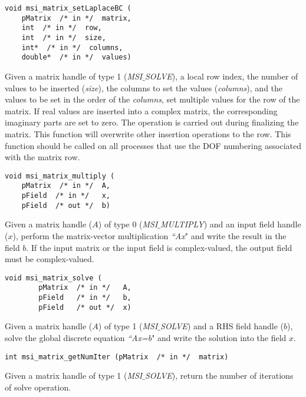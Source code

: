 \begin{verbatim}
void msi_matrix_setLaplaceBC (
    pMatrix  /* in */  matrix, 
    int  /* in */  row, 
    int  /* in */  size, 
    int*  /* in */  columns, 
    double*  /* in */  values)
\end{verbatim}\vspace{-.5cm}\hspace{1cm}
Given a matrix handle of type 1 (\textit{MSI$\_$SOLVE}), a local row index, the  number of values to be inserted (\textit{size}), the columns to set the values (\textit{columns}), and the values to be set in the order of the \textit{columns}, set multiple values for the row of the matrix. If real values are inserted into a complex matrix, the corresponding imaginary parts are set to zero. The operation is carried out during finalizing the matrix. 
This function will overwrite other insertion operations to the row. This function should be called on all processes that use the DOF numbering associated with the matrix row.

\begin{verbatim}
void msi_matrix_multiply (
    pMatrix  /* in */  A, 
    pField  /* in */   x, 
    pField  /* out */  b)
\end{verbatim}\vspace{-.5cm}\hspace{1cm}
Given a matrix handle ($A$) of type 0 (\textit{MSI$\_$MULTIPLY}) and an input field handle ($x$), perform the matrix-vector multiplication \textit{``Ax}" and write the result in the field $b$. If the input matrix or the input field is complex-valued, the output field must be complex-valued.

\begin{verbatim}
void msi_matrix_solve (
        pMatrix  /* in */   A, 
        pField   /* in */   b, 
        pField   /* out */  x)
\end{verbatim}\vspace{-.5cm}\hspace{1cm}
Given a matrix handle ($A$) of type 1 (\textit{MSI$\_$SOLVE}) and a RHS field handle ($b$), solve the global discrete equation \textit{``Ax=b}" and write the solution into the field $x$. 

\begin{verbatim}
int msi_matrix_getNumIter (pMatrix  /* in */  matrix)
\end{verbatim}\vspace{-.5cm}\hspace{1cm}
Given a matrix handle of type 1 (\textit{MSI$\_$SOLVE}), return the number of iterations of solve operation.

